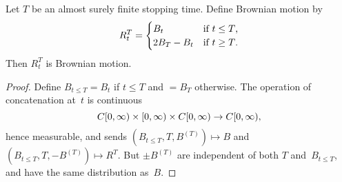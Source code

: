\begin	{theorem}
Let $T$ be an almost surely finite stopping time.
Define  Brownian motion by \[
	R^T_t =
	\begin	{cases}
		B_t	& \text{if \( t \le T \),} \\
		2B_T - B_t	& \text{if \( t \ge T \).}
	\end	{cases}
\]
Then $R^T_t$ is Brownian motion.
\end	{theorem}
\begin	{proof}
Define \(B_{t \le T} = B_t\) if \( t \le T \) and \( = B_T \) otherwise.
The operation of concatenation at~$t$ is continuous \[
	C[0,\infty) \times [0,\infty) \times C[0,\infty) \to C[0,\infty)
	\text,
\] hence measurable,
and sends \( (B_{t \le T},T,B^{(T)}) \mapsto B \)
and \( (B_{t \le T},T,-B^{(T)}) \mapsto R^T \).
But $\pm B^{(T)}$ are independent of both $T$ and~$B_{t \le T}$,
and have the same distribution as~$B$.
\end	{proof}
